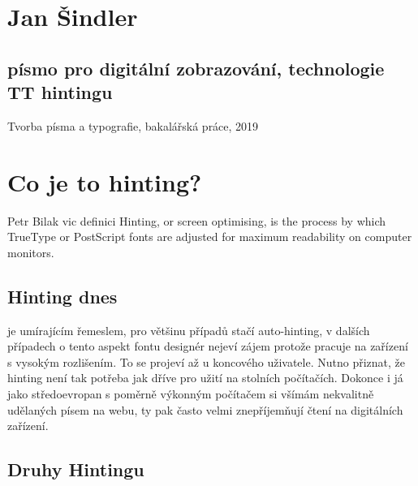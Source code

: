 \documentclass[a4paper]{article}
\begin{document}
\section*{Jan Šindler}
\subsection*{písmo pro digitální zobrazování, technologie TT hintingu}
Tvorba písma a typografie, bakalářská práce, 2019\\



\section{Co je to hinting?}

Petr Bilak \* vic definici \* Hinting, or screen optimising, is the process by which TrueType or PostScript fonts are adjusted for maximum readability on computer monitors.



\subsection{Hinting dnes}

je umírajícím řemeslem, pro většinu případů stačí auto-hinting, v dalších případech o tento aspekt fontu designér nejeví zájem protože pracuje na zařízení s vysokým rozlišením. To se projeví až u koncového uživatele. Nutno přiznat, že hinting není tak potřeba jak dříve pro užití na stolních počítačích. Dokonce i já jako středoevropan s poměrně výkonným počítačem si všímám nekvalitně udělaných písem na webu, ty pak často velmi znepříjemňují čtení na digitálních zařízení. 


\subsection{Druhy Hintingu}
\end{document}
